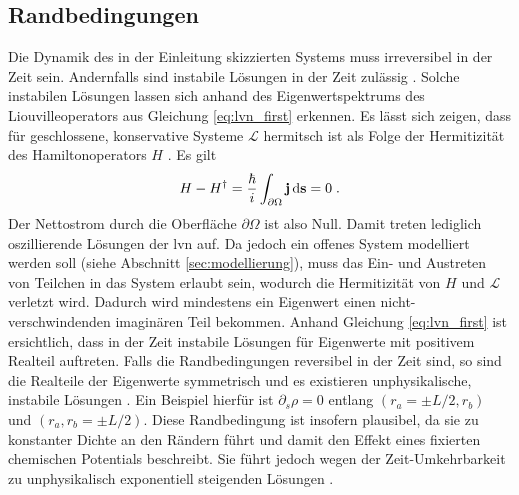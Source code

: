 \subsection{Randbedingungen}
\label{sec:RB}
Die Dynamik des in der Einleitung skizzierten Systems muss irreversibel in der Zeit sein. Andernfalls sind instabile Lösungen in der Zeit zulässig \cite{frensley2}. Solche instabilen Lösungen lassen sich anhand des Eigenwertspektrums des Liouvilleoperators aus Gleichung \eqref{eq:lvn_first} erkennen. Es lässt sich zeigen, dass für geschlossene, konservative Systeme $\mathcal{L}$ hermitsch ist als Folge der Hermitizität des Hamiltonoperators $H$ \cite{frensley2}. Es gilt
\begin{align*}
  H- H^{\dagger} = \frac{\hbar}{i}\int_{\partial\Omega} \vb{j}\mathop{}\!\mathrm{d}\vb{s} = 0 \; .
\end{align*}
Der Nettostrom durch die Oberfläche $\partial\Omega$ ist also Null. Damit treten lediglich oszillierende Lösungen der \ac{lvn} auf. Da jedoch ein offenes System modelliert werden soll (siehe Abschnitt \ref{sec:modellierung}), muss das Ein- und Austreten von Teilchen in das System erlaubt sein, wodurch die Hermitizität von $H$ und $\mathcal{L}$ verletzt wird. Dadurch wird mindestens ein Eigenwert einen nicht-verschwindenden imaginären Teil bekommen. Anhand Gleichung \eqref{eq:lvn_first} ist ersichtlich, dass in der Zeit instabile Lösungen für Eigenwerte mit positivem Realteil auftreten. Falls die Randbedingungen reversibel in der Zeit sind, so sind die Realteile der Eigenwerte symmetrisch und es existieren unphysikalische, instabile Lösungen \cite{frensley2}. Ein Beispiel hierfür ist $\partial_s \rho = 0$ entlang $(r_a=\pm L/2, r_b)$ und $(r_a,r_b=\pm L/2)$. Diese Randbedingung ist insofern plausibel, da sie zu konstanter Dichte an den Rändern führt und damit den Effekt eines fixierten chemischen Potentials beschreibt. Sie führt jedoch wegen der Zeit-Umkehrbarkeit zu unphysikalisch exponentiell steigenden Lösungen \cite{frensley2}.

